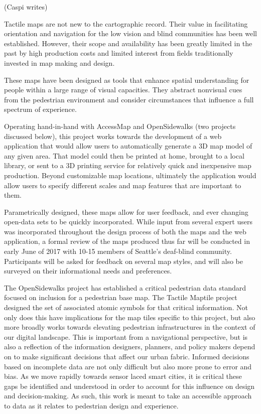 (Caspi writes)

Tactile maps are not new to the cartographic record. Their value in facilitating orientation and navigation for the low vision and blind communities has been well established. However, their scope and availability has been greatly limited in the past by high production costs and limited interest from fields traditionally invested in map making and design. 


These maps have been designed as tools that enhance spatial understanding for people within a large range of visual capacities.  They abstract nonvisual cues from the pedestrian environment and consider circumstances that influence a full spectrum of experience. 


Operating hand-in-hand with AccessMap and OpenSidewalks (two projects discussed below), this project works towards the development of a web application that would allow users to automatically generate a 3D map model of any given area.  That model could then be printed at home, brought to a local library, or sent to a 3D printing service for relatively quick and inexpensive map production.  Beyond customizable map locations, ultimately the application would allow users to specify different scales and map features that are important to them.  

Parametrically designed, these maps allow for user feedback, and ever changing open-data sets to be quickly incorporated.  While input from several expert users was incorporated throughout the design process of both the maps and the web application, a formal review of the maps produced thus far will be conducted in early June of 2017 with 10-15 members of Seattle’s deaf-blind community. Participants will be asked for feedback on several map styles, and will also be surveyed on their informational needs and preferences.  

The OpenSidewalks project has established a critical pedestrian data standard focused on inclusion for a pedestrian base map. The Tactile Maptile project designed the set of associated atomic symbols for that critical information.  Not only does this have implications for the map tiles specific to this project, but also more broadly works towards elevating pedestrian infrastructures in the context of our digital landscape.  This is important from a navigational perspective, but is also a reflection of the information designers, planners, and policy makers depend on to make significant decisions that affect our urban fabric.  Informed decisions based on incomplete data are not only difficult but also more prone to error and bias.  As we move rapidly towards sensor laced smart cities, it is critical these gaps be identified and understood in order to account for this influence on design and decision-making.  As such, this work is meant to take an accessible approach to data as it relates to pedestrian design and experience.

